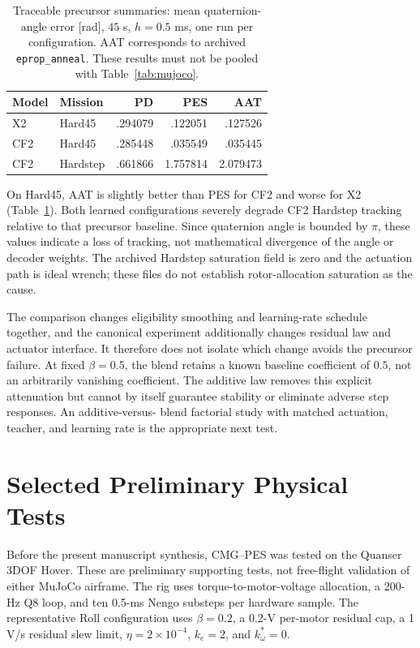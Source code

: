 \documentclass[letterpaper,10pt,conference]{IEEEtran}
\begin{document}
\begin{table}[t]
\caption{Traceable precursor summaries: mean quaternion-angle error [rad],
$45$ s, $h=0.5$ ms, one run per configuration. AAT corresponds to archived
\texttt{eprop\_anneal}. These results must not be pooled with
Table~\ref{tab:mujoco}.}
\label{tab:aat}\centering\small
\begin{tabular}{llrrr}
\toprule
Model&Mission&PD&PES&AAT\\\midrule
X2&Hard45&.294079&.122051&.127526\\
CF2&Hard45&.285448&.035549&.035445\\
CF2&Hardstep&.661866&1.757814&2.079473\\\bottomrule
\end{tabular}
\end{table}
On Hard45, AAT is slightly better than PES for CF2 and worse for X2
(Table~\ref{tab:aat}).
Both learned configurations severely degrade CF2 Hardstep tracking relative
to that precursor baseline. Since quaternion angle is bounded by $\pi$,
these values indicate a loss of tracking, not mathematical divergence of
the angle or decoder weights. The archived Hardstep saturation field is
zero and the actuation path is ideal wrench; these files do not establish
rotor-allocation saturation as the cause.

The comparison changes eligibility smoothing and learning-rate schedule
together, and the canonical experiment additionally changes residual law
and actuator interface. It therefore does not isolate which change avoids
the precursor failure. At fixed $\beta=0.5$, the blend retains a known
baseline coefficient of $0.5$, not an arbitrarily vanishing coefficient.
The additive law removes this explicit attenuation but cannot by itself
guarantee stability or eliminate adverse step responses. An additive-versus-
blend factorial study with matched actuation, teacher, and learning rate
is the appropriate next test.

\section{Selected Preliminary Physical Tests}
\label{sec:hover}
Before the present manuscript synthesis, CMG--PES was tested on the Quanser
3DOF Hover. These are preliminary supporting tests, not free-flight
validation of either MuJoCo airframe. The rig uses torque-to-motor-voltage
allocation, a 200-Hz Q8 loop, and ten 0.5-ms Nengo substeps per hardware
sample. The representative Roll configuration uses $\beta=0.2$, a 0.2-V
per-motor residual cap, a 1 V/s residual slew limit, $\eta=2\times10^{-4}$,
$k_e=2$, and $k_\omega^*=0$.
\end{document}
